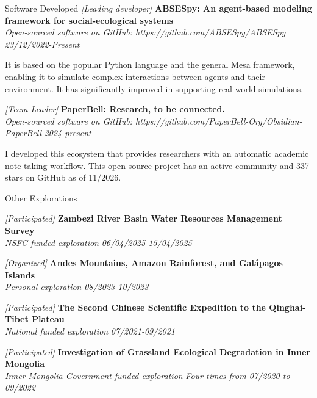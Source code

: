 \documentclass{resume} %
\newcommand{\projectentry}[4]{\textit{[#1]} {\bf #2} \\ \textnormal{\em #3} \hfill {\em #4}}
\begin{document}
\begin{rSection}{Software Developed}
    \projectentry{Leading developer}{ABSESpy: An agent-based modeling framework for social-ecological systems}{Open-sourced software on GitHub: https://github.com/ABSESpy/ABSESpy}{23/12/2022-Present}


It is based on the popular Python language and the general Mesa framework, enabling it to simulate complex interactions between agents and their environment. It has significantly improved in supporting real-world simulations.

\projectentry{Team Leader}{PaperBell: Research, to be connected.}{Open-sourced software on GitHub: https://github.com/PaperBell-Org/Obsidian-PaperBell}{2024-present}

I developed this ecosystem that provides researchers with an automatic academic note-taking workflow. This open-source project has an active community and 337 stars on GitHub as of 11/2026.

\end{rSection}

\begin{rSection}{Other Explorations}

    \projectentry{Participated}{Zambezi River Basin Water Resources Management Survey}{NSFC funded exploration}{06/04/2025-15/04/2025}

    \projectentry{Organized}{Andes Mountains, Amazon Rainforest, and Galápagos Islands}{Personal exploration}{08/2023-10/2023}

    \projectentry{Participated}{The Second Chinese Scientific Expedition to the Qinghai-Tibet Plateau}{National funded exploration}{07/2021-09/2021}

    \projectentry{Participated}{Investigation of Grassland Ecological Degradation in Inner Mongolia}{Inner Mongolia Government funded exploration}{Four times from 07/2020 to 09/2022}

\end{rSection}
\end{document}

